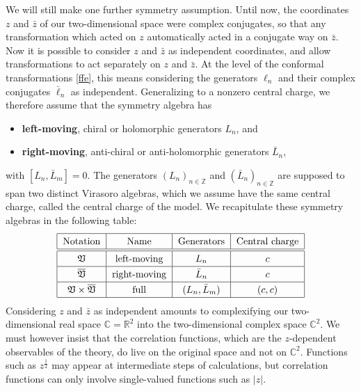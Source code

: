 \documentclass[12pt, a4paper, notitlepage, twoside]{report}
\numberwithin{equation}{section}
\theoremstyle{break}
\begin{document}
We will still make one further symmetry assumption.
Until now, the coordinates $z$ and $\bar{z}$ of our two-dimensional space were complex conjugates, so that any transformation which acted on $z$ automatically acted in a conjugate way on $\bar{z}$.
Now it is possible to consider $z$ and $\bar{z}$ as independent coordinates, and allow transformations to act separately on $z$ and $\bar{z}$.
At the level of the conformal transformations \eqref{ffe}, this means considering the generators $\ell_n$ and their complex conjugates $\bar{\ell}_n$ as independent.
Generalizing to a nonzero central charge, we therefore assume that the symmetry algebra has 
\begin{itemize}
 \item \textbf{\boldmath left-moving}, chiral or holomorphic
generators $L_n$,  and
\item  \textbf{\boldmath right-moving}, anti-chiral or anti-holomorphic generators $\bar{L}_n$,
\end{itemize}
 with
$[L_n,\bar{L}_m]=0$.
The generators $(L_n)_{n\in{\mathbb{Z}}}$ and $(\bar{L}_n)_{n\in{\mathbb{Z}}}$ are supposed to span two distinct Virasoro algebras, which we assume have the same central charge, called the central charge of the model. 
We recapitulate these symmetry algebras in the following table:
\begin{align}
\renewcommand{\arraystretch}{1.3}
 \begin{tabular}{|c|c|c|c|}
 \hline
Notation &  Name & Generators &  Central\ charge
\\
\hline\hline
 $\mathfrak{V}$ & left-moving & $L_n$ & $c$
\\
\hline
$\overline{\mathfrak{V}}$ & right-moving & $\bar{L}_n$ & $c$
\\
\hline
$\mathfrak{V}\times \overline{\mathfrak{V}}$ & full & $(L_n,\bar{L}_m)$ & $(c,c)$
\\  
\hline
 \end{tabular}
\end{align}
Considering $z$ and $\bar{z}$ as independent amounts to complexifying our two-dimensional real space ${\mathbb{C}}={\mathbb{R}}^2$ into the two-dimensional complex space ${\mathbb{C}}^2$.
We must however insist that the correlation functions, which are the $z$-dependent observables of the theory, do live on the original space and not on ${\mathbb{C}}^2$.
Functions such as $z^\frac12$ may appear at intermediate steps of calculations, but correlation functions can only involve single-valued functions such as $|z|$.
\end{document}
